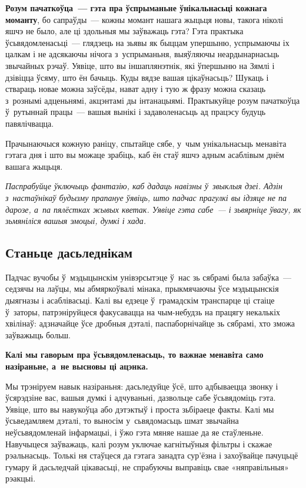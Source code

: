 \textbf{Розум пачаткоўца~--- гэта пра ўспрыманьне ўнікальнасьці кожнага моманту}, бо сапраўды~--- кожны момант нашага жыцьця новы, такога ніколі яшчэ не было, але ці здольныя мы заўважаць гэта? Гэта практыка ўсьвядомленасьці~--- глядзець на зьявы як быццам упершыню, успрымаючы іх цалкам і не адсякаючы нічога з~успрыманьня, выяўляючы неардынарнасьць звычайных рэчаў. Уявіце, што вы іншаплянэтнік, які ўпершыню на Зямлі і дзівіцца ўсяму, што ён бачыць. Куды вядзе вашая цікаўнасьць? Шукаць і ствараць новае можна заўсёды, нават адну і тую ж фразу можна сказаць з~рознымі адценьнямі, акцэнтамі ды інтанацыямі. Практыкуйце розум пачаткоўца ў~рутыннай працы~--- вашыя вынікі і задаволенасьць ад працэсу будуць павялічвацца. 


Прачынаючыся кожную раніцу, спытайце сябе, у~чым унікальнасьць менавіта гэтага дня і што вы можаце зрабіць, каб ён стаў яшчэ адным асаблівым днём вашага жыцьця.

\emph{Паспрабуйце ўключыць фантазію, каб дадаць навізны ў~звыклыя дзеі. Адзін з~настаўнікаў будызму прапануе ўявіць, што падчас прагулкі вы ідзяце не па дарозе, а~па пялёстках жывых кветак. Уявіце гэта сабе~--- і зьвярніце ўвагу, як зьмяніліся вашыя эмоцыі, думкі і хада.}

\subsection*{Станьце дасьледнікам}

Падчас вучобы ў~мэдыцынскім унівэрсытэце ў~нас зь сябрамі была забаўка~--- седзячы на лаўцы, мы абмяркоўвалі мінака, прыкмячаючы ўсе мэдыцынскія дыягназы і асаблівасьці. Калі вы едзеце ў~грамадскім транспарце ці стаіце ў~заторы, патрэніруйцеся факусавацца на чым-небудзь на працягу некалькіх хвілінаў: адзначайце ўсе дробныя дэталі, паспаборнічайце зь сябрамі, хто зможа заўважыць больш.

\textbf{Калі мы гаворым пра ўсьвядомленасьць, то важнае менавіта само назіраньне, а~не высновы ці ацэнка.}

Мы трэніруем навык назіраньня: дасьледуйце ўсё, што адбываецца звонку і ўсярэдзіне вас, вашыя думкі і адчуваньні, дазвольце сабе ўсьвядоміць гэта. Уявіце, што вы навукоўца або дэтэктыў і проста зьбіраеце факты. Калі мы ўсьведамляем дэталі, то выносім у~сьвядомасьць шмат звычайна неўсьвядомленай інфармацыі, і ўжо гэта мяняе нашае да яе стаўленьне. Навучыцеся заўважаць, калі розум уключае кагнітыўныя фільтры і скажае рэальнасьць. Толькі ня стаўцеся да гэтага занадта сур'ёзна і захоўвайце пачуцьцё гумару й дасьледчай цікавасьці, не спрабуючы выправіць свае «няправільныя» рэакцыі.

